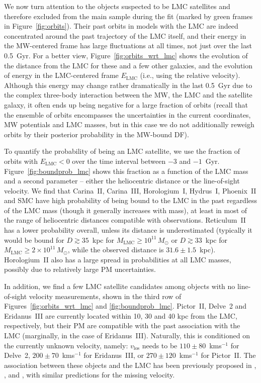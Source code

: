 \documentclass[usenatbib,fleqn]{mnras}
\newcommand{\kms}{km\:s$^{-1}$\xspace}
\begin{document}
We now turn attention to the objects suspected to be LMC satellites and therefore excluded from the main sample during the fit (marked by green frames in Figure~\ref{fig:orbits}). Their past orbits in models with the LMC are indeed concentrated around the past trajectory of the LMC itself, and their energy in the MW-centered frame has large fluctuations at all times, not just over the last 0.5~Gyr. For a better view, Figure~\ref{fig:orbits_wrt_lmc} shows the evolution of the distance from the LMC for these and a few other galaxies, and the evolution of energy in the LMC-centered frame $E_\text{LMC}$ (i.e., using the relative velocity). Although this energy may change rather dramatically in the last 0.5~Gyr due to the complex three-body interaction between the MW, the LMC and the satellite galaxy, it often ends up being negative for a large fraction of orbits (recall that the ensemble of orbits encompasses the uncertainties in the current coordinates, MW potentials and LMC masses, but in this case we do not additionally reweigh orbits by their posterior probability in the MW-bound DF).

To quantify the probability of being an LMC satellite, we use the fraction of orbits with $E_\text{LMC}<0$ over the time interval between $-3$ and $-1$~Gyr. Figure~\ref{fig:boundprob_lmc} shows this fraction as a function of the LMC mass and a second parameter -- either the heliocentric distance or the line-of-sight velocity. We find that Carina~II, Carina~III, Horologium~I, Hydrus~I, Phoenix~II and SMC have high probability of being bound to the LMC in the past regardless of the LMC mass (though it generally increases with mass), at least in most of the range of heliocentric distances compatible with observations. Reticulum~II has a lower probability overall, unless its distance is underestimated (typically it would be bound for $D\gtrsim 35$~kpc for $M_\text{LMC} \ge 10^{11}\,M_\odot$ or $D\gtrsim33$~kpc for $M_\text{LMC} \ge 2\times10^{11}\,M_\odot$, while the observed distance is $31.6\pm1.5$~kpc). Horologium~II also has a large spread in probabilities at all LMC masses, possibly due to relatively large PM uncertainties.

In addition, we find a few LMC satellite candidates among objects with no line-of-sight velocity measurements, shown in the third row of Figures~\ref{fig:orbits_wrt_lmc} and \ref{fig:boundprob_lmc}. Pictor~II, Delve~2 and Eridanus~III are currently located within 10, 30 and 40 kpc from the LMC, respectively, but their PM are compatible with the past association with the LMC (marginally, in the case of Eridanus~III). Naturally, this is conditioned on the currently unknown velocity, namely: $v_\text{los}$ needs to be $110\pm80$~\kms for Delve~2, $200\pm70$~\kms for Eridanus~III, or $270\pm120$~\kms for Pictor~II. The association between these objects and the LMC has been previously proposed in \citet{Cerny2021}, \citet{Kallivayalil2018}, \citet{Erkal2020a} and \citet{DrlicaWagner2016}, with similar predictions for the missing velocity.
\end{document}
